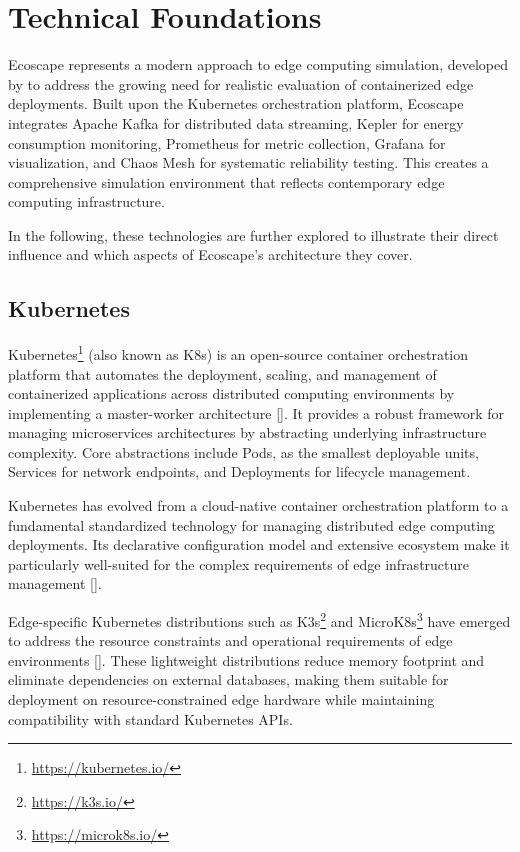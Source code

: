 
\section{Technical Foundations}
Ecoscape represents a modern approach to edge computing simulation, developed by \cite{reiter2025ecoscapefaulttolerancebenchmark} to address the growing need for realistic evaluation of containerized edge deployments.
Built upon the Kubernetes orchestration platform, Ecoscape integrates Apache Kafka for distributed data streaming, Kepler for energy consumption monitoring, Prometheus for metric collection, Grafana for visualization, and Chaos Mesh for systematic reliability testing.
This creates a comprehensive simulation environment that reflects contemporary edge computing infrastructure.

In the following, these technologies are further explored to illustrate their direct influence and which aspects of Ecoscape's architecture they cover.
\subsection{Kubernetes}
Kubernetes\footnote{\url{https://kubernetes.io/}} (also known as K8s) is an open-source container orchestration platform that automates the deployment, scaling, and management of containerized applications across distributed computing environments by implementing a master-worker architecture [\cite{10.5555/3175917}].
It provides a robust framework for managing microservices architectures by abstracting underlying infrastructure complexity.
Core abstractions include Pods, as the smallest deployable units, Services for network endpoints, and Deployments for lifecycle management.

Kubernetes has evolved from a cloud-native container orchestration platform to a fundamental standardized technology for managing distributed edge computing deployments.
Its declarative configuration model and extensive ecosystem make it particularly well-suited for the complex requirements of edge infrastructure management [\cite{10.1145/3539606}].

Edge-specific Kubernetes distributions such as K3s\footnote{\url{https://k3s.io/}} and MicroK8s\footnote{\url{https://microk8s.io/}} have emerged to address the resource constraints and operational requirements of edge environments [\cite{10.1145/3578244.3583737}].
These lightweight distributions reduce memory footprint and eliminate dependencies on external databases, making them suitable for deployment on resource-constrained edge hardware while maintaining compatibility with standard Kubernetes APIs.

